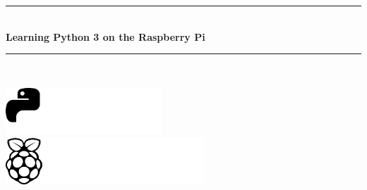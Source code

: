 \makeatletter
\pagecolor{TitleColor}\afterpage{\nopagecolor}
{\color{white}
\begin{titlepage}
 \begin{center}
  {\fontsize{53}{63}\selectfont \textbf{\thetitle}\par}
  \rule{\linewidth}{1.5mm}
  \\[0.4cm]
  {\fontsize{24}{44}\selectfont \color{black} \textbf{Learning Python 3 on the Raspberry Pi}}
\end{center}
\vfill
\hfill
\begin{minipage}{0.61\textwidth}
\begin{flushright}
  {\LARGE \textbf{\theauthor}}
  \rule{\linewidth}{1.0mm}
  \\[0.4cm]
  {\LARGE \color{black} \textbf{\textit{\py@release}}}
 \end{flushright}
 \end{minipage}
\vfill
\includegraphics[height=1.75cm,keepaspectratio]{python-logo-bw.pdf}\hfill
\includegraphics[height=1.75cm,keepaspectratio]{raspberry-pi-logo-bw.pdf}
\end{titlepage}
}
\makeatother

